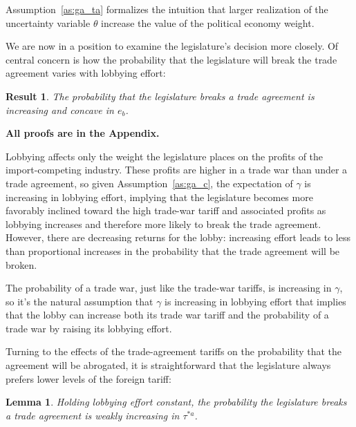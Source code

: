 \documentclass[10pt]{article}
\newtheorem{lemma}{Lemma}
\newtheorem{result}{Result}
\newcommand{\ta}{\theta}
\newcommand{\ga}{\gamma}
\begin{document}
Assumption~\ref{as:ga_ta} formalizes the intuition that larger realization of the uncertainty variable $\ta$ increase the value of the political economy weight.


We are now in a position to examine the legislature's decision more closely. Of central concern is how the probability that the legislature will break the trade agreement varies with lobbying effort: 

\begin{result}
  The probability that the legislature breaks a trade agreement is increasing and concave in $e_b$.
  \label{res:bincC}
\end{result}

\noindent \textbf{All proofs are in the Appendix.}

Lobbying affects only the weight the legislature places on the profits of the import-competing industry. These profits are higher in a trade war than under a trade agreement, so given Assumption~\ref{as:ga_c}, the expectation of $\ga$ is increasing in lobbying effort, implying that the legislature becomes more favorably inclined toward the high trade-war tariff and associated profits as lobbying increases and therefore more likely to break the trade agreement. However, there are decreasing returns for the lobby: increasing effort leads to less than proportional increases in the probability that the trade agreement will be broken.

The probability of a trade war, just like the trade-war tariffs, is increasing in $\ga$, so it's the natural assumption that $\ga$ is increasing in lobbying effort that implies that the lobby can increase both its trade war tariff and the probability of a trade war by raising its lobbying effort.

Turning to the effects of the trade-agreement tariffs on the probability that the agreement will be abrogated, it is straightforward that the legislature always prefers lower levels of the foreign tariff:
\begin{lemma}
  Holding lobbying effort constant, the probability the legislature breaks a trade agreement is weakly increasing in $\tau^{*a}$.
  \label{lem:leg_astar}
\end{lemma}
\end{document}
